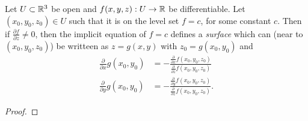 \begin{theorem}
    Let $U \subset \mathbb{R}^3$ be open and $f(x, y, z): U \to \mathbb{R}$ be differentiable. Let $(x_0, y_0, z_0) \in U$ such that it is on the level set $f = c$, for some constant $c$. Then if $\frac{\partial f}{\partial z} \neq 0$, then the implicit equation of $f = c$ defines a \emph{surface} which can (near to $(x_0, y_0, z_0)$) be writteen as $z = g(x, y)$ with $z_0 = g(x_0, y_0)$ and
    \begin{align*}
        \frac{\partial}{\partial x} g(x_0, y_0) &= -\frac{\frac{\partial}{\partial x}f(x_0, y_0, z_0)}{\frac{\partial}{\partial z}f(x_0, y_0, z_0)} \\
        \frac{\partial}{\partial y} g(x_0, y_0) &= -\frac{\frac{\partial}{\partial y} f(x_0, y_0, z_0)}{\frac{\partial}{\partial z} f(x_0, y_0, z_0)}.
    \end{align*}
\end{theorem}

\begin{proof}
\end{proof}
